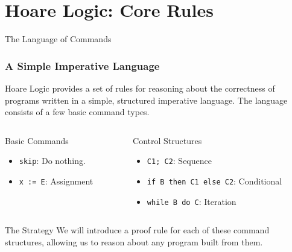 \documentclass[aspectratio=169]{beamer}
\newcommand{\code}[1]{\lstinline|#1|}
\begin{document}
\section{Hoare Logic: Core Rules}

\begin{frame}{The Language of Commands}
    \frametitle{A Simple Imperative Language}
    Hoare Logic provides a set of rules for reasoning about the correctness of programs written in a simple, structured imperative language. The language consists of a few basic command types.
    
    \begin{columns}
    \begin{column}{0.5\textwidth}
        \begin{block}{Basic Commands}
            \begin{itemize}
                \item \code{skip}: Do nothing.
                \item \code{x := E}: Assignment
            \end{itemize}
        \end{block}
    \end{column}
    \begin{column}{0.5\textwidth}
        \begin{block}{Control Structures}
            \begin{itemize}
                \item \code{C1; C2}: Sequence
                \item \code{if B then C1 else C2}: Conditional
                \item \code{while B do C}: Iteration
            \end{itemize}
        \end{block}
    \end{column}
    \end{columns}
    
    \vfill
    \begin{alertblock}{The Strategy}
        We will introduce a proof rule for each of these command structures, allowing us to reason about any program built from them.
    \end{alertblock}
\end{frame}
\end{document}
